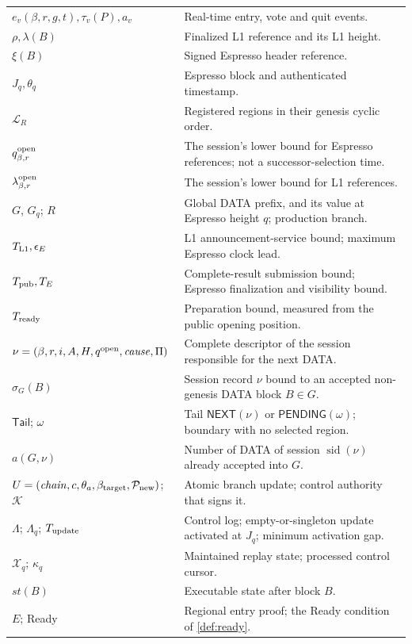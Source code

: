 \documentclass[11pt,a4paper]{article}
\newcommand{\tagg}[1]{\ensuremath{\mathsf{#1}}}
\begin{document}
\begin{table}[htbp]
\begin{tabularx}{\linewidth}{@{}p{.32\linewidth}Y@{}}
$e_v(\beta,r,g,t),\tau_v(P),a_v$ & Real-time entry, vote and quit events.\\
$\rho,\lambda(B)$ & Finalized L1 reference and its L1 height.\\
$\xi(B)$ & Signed Espresso header reference.\\
$J_q,\theta_q$ & Espresso block and authenticated timestamp.\\
$\mathcal L_R$ & Registered regions in their genesis cyclic order.\\
$q_{\beta,r}^{\rm open}$ & The session's lower bound for Espresso references; not a successor-selection time.\\
$\lambda_{\beta,r}^{\rm open}$ & The session's lower bound for L1 references.\\
$G$, $G_q$; $R$ & Global DATA prefix, and its value at Espresso height $q$; production branch.\\
$T_{\rm L1},\epsilon_E$ & L1 announcement-service bound; maximum Espresso clock lead.\\
$T_{\rm pub},T_E$ & Complete-result submission bound; Espresso finalization and visibility bound.\\
$T_{\rm ready}$ & Preparation bound, measured from the public opening position.\\
$\nu=(\beta,r,i,A,H,q^{\rm open},\mathit{cause},\Pi)$ & Complete descriptor of the session responsible for the next DATA.\\
$\sigma_G(B)$ & Session record $\nu$ bound to an accepted non-genesis DATA block $B\in G$.\\
$\mathsf{Tail}$; $\omega$ & Tail $\tagg{NEXT}(\nu)$ or $\tagg{PENDING}(\omega)$; boundary with no selected region.\\
$a(G,\nu)$ & Number of DATA of session $\operatorname{sid}(\nu)$ already accepted into $G$.\\
$U=(\mathit{chain},c,\theta_a,\beta_{\rm target},\mathcal P_{\rm new})$; $\mathcal K$ & Atomic branch update; control authority that signs it.\\
$\Lambda$; $\Lambda_q$; $T_{\rm update}$ & Control log; empty-or-singleton update activated at $J_q$; minimum activation gap.\\
$\mathcal X_q$; $\kappa_q$ & Maintained replay state; processed control cursor.\\
$\mathit{st}(B)$ & Executable state after block $B$.\\
$E$; Ready & Regional entry proof; the Ready condition of \cref{def:ready}.\\
\bottomrule\end{tabularx}
\end{table}
\end{document}
